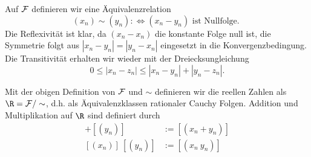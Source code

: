 \documentclass[letterpaper,10pt,english]{jupyterBook}
\begin{document}
Auf \({\cal F}\) definieren wir eine Äquivalenzrelation
\begin{equation*}
 (x_n) \sim (y_n) : \Leftrightarrow (x_n-y_n) \text{ ist Nullfolge. }
\end{equation*}
Die Reflexivität ist klar, da \((x_n-x_n)\) die konstante Folge null ist, die Symmetrie folgt aus \(|x_n-y_n|=|y_n-x_n|\) eingesetzt in die Konvergenzbedingung. Die Transitivität erhalten wir wieder mit der Dreiecksungleichung
\begin{equation*}
 0 \leq  |x_n - z_n| \leq |x_n-y_n| + |y_n - z_n|.
\end{equation*}\label{grundlagen/zahlensysteme:definition-18}
\begin{definition}{}{}



Mit der obigen Definition von \({\cal F}\) und \(\sim\) definieren wir die reellen Zahlen als \(\R = {\cal F}/\sim\), d.h. als Äquivalenzklassen rationaler Cauchy Folgen.
Addition und Multiplikation auf \(\R\) sind definiert durch
\begin{align*}
[(x_n)] + [(y_n)] &:= [(x_n+y_n)] \\
[(x_n)] ~ [(y_n)] &:= [(x_n~y_n)]\end{align*}\end{definition}
\end{document}
